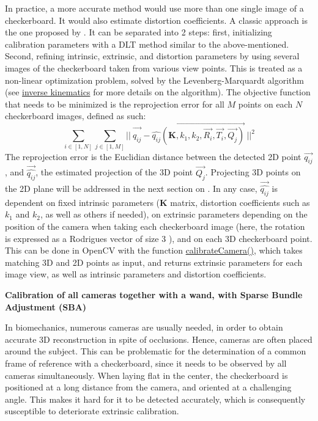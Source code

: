 In practice, a more accurate method would use more than one single image of a checkerboard. It would also estimate distortion coefficients. A classic approach is the one proposed by \cite{Zhang2000}. It can be separated into 2 steps: first, initializing calibration parameters with a DLT method similar to the above-mentioned. Second, refining intrinsic, extrinsic, and distortion parameters by using several images of the checkerboard taken from various view points. This is treated as a non-linear optimization problem, solved by the Levenberg-Marquardt algorithm \cite{Marquardt1963,More1978} (see \hyperref[invkin]{inverse kinematics} for more details on the algorithm). The objective function that needs to be minimized is the reprojection error for all $M$ points on each $N$ checkerboard images, defined as such:
\begin{equation}\label{eq:LM_algo}
  \sum_{i \in [1,N]} \sum_{j \in [1,M]} 
  ||\ \overrightarrow{q_{ij}^{\ ^{\ ^{\ ^{\ }}}}} -
  \overrightarrow{\widehat{q_{ij}}(\textbf{K},k_1,k_2,\overrightarrow{R_i},\overrightarrow{T_i},\overrightarrow{Q_j})}\ 
  ||^2
\end{equation} 
The reprojection error is the Euclidian distance between the detected 2D point $\overrightarrow{q_{ij}}$, and $\overrightarrow{\widehat{q_{ij}}}$, the estimated projection of the 3D point $\overrightarrow{Q_j}$. Projecting 3D points on the 2D plane will be addressed in the next section on . In any case, $\overrightarrow{\widehat{q_{ij}}}$ is dependent on fixed intrinsic parameters (\textbf{K} matrix, distortion coefficients such as $k_1$ and $k_2$, as well as others if needed), on extrinsic parameters depending on the position of the camera when taking each checkerboard image (here, the rotation is expressed as a Rodrigues vector of size 3 \cite{Gallego2015}), and on each 3D checkerboard point. This can be done in OpenCV with the function \href{https://docs.opencv.org/4.x/d9/d0c/group__calib3d.html#ga3207604e4b1a1758aa66acb6ed5aa65d}{calibrateCamera()}, which takes matching 3D and 2D points as input, and returns extrinsic parameters for each image view, as well as intrinsic parameters and distortion coefficients.

\vspace*{0.5cm}
\noindent\textbf{Calibration of all cameras together with a wand, with Sparse Bundle Adjustment (SBA)} 

In biomechanics, numerous cameras are usually needed, in order to obtain accurate 3D reconstruction in spite of occlusions. Hence, cameras are often placed around the subject. This can be problematic for the determination of a common frame of reference with a checkerboard, since it needs to be observed by all cameras simultaneously. When laying flat in the center, the checkerboard is positioned at a long distance from the camera, and oriented at a challenging angle. This makes it hard for it to be detected accurately, which is consequently susceptible to deteriorate extrinsic calibration. 


